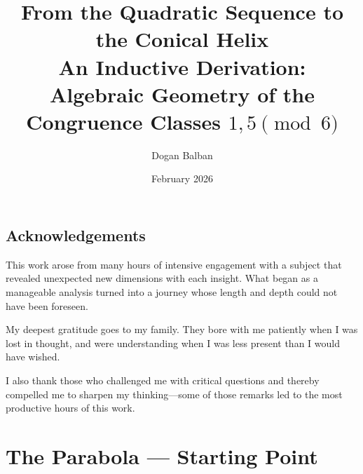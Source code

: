 \documentclass[12pt,a4paper]{report}
\title{%
  \textbf{From the Quadratic Sequence to the Conical Helix}\\[0.8em]
  \large
  An Inductive Derivation:\\
  Algebraic Geometry of the Congruence Classes $1,5\pmod{6}$
}
\author{Dogan Balban}
\date{February 2026}
\theoremstyle{plain}
\theoremstyle{definition}
\theoremstyle{remark}
\begin{document}
\maketitle




\tableofcontents
\clearpage

\chapter*{Acknowledgements}

This work arose from many hours of intensive engagement with a subject
that revealed unexpected new dimensions with each insight. What began as
a manageable analysis turned into a journey whose length and depth could
not have been foreseen.

My deepest gratitude goes to my family. They bore with me patiently when
I was lost in thought, and were understanding when I was less present
than I would have wished.

I also thank those who challenged me with critical questions and thereby
compelled me to sharpen my thinking---some of those remarks led to the
most productive hours of this work.

\clearpage

%
%

\part{The Parabola --- Starting Point}
%
%
\end{document}
